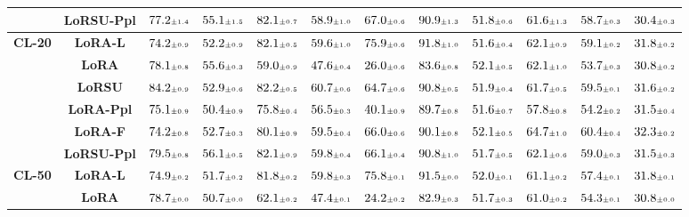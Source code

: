 \begin{table}
\begin{center}
\begin{small}
\begin{tabular}{l c c c c c c c c c c c}
& \textbf{LoRSU-Ppl} & $77.2 \mtiny{\pm 1.4}$ & $55.1 \mtiny{\pm 1.5}$ & $82.1 \mtiny{\pm 0.7}$ & $58.9 \mtiny{\pm 1.0}$ & $67.0 \mtiny{\pm 0.6}$ & $90.9 \mtiny{\pm 1.3}$ & $51.8 \mtiny{\pm 0.6}$ & $61.6 \mtiny{\pm 1.3}$ & $58.7 \mtiny{\pm 0.3}$ & $30.4 \mtiny{\pm 0.3}$ \\
\midrule
\multirow{6}{*}{\textbf{CL-20}} & \textbf{LoRA-L} & $74.2 \mtiny{\pm 0.9}$ & $52.2 \mtiny{\pm 0.9}$ & $82.1 \mtiny{\pm 0.5}$ & $59.6 \mtiny{\pm 1.0}$ & $75.9 \mtiny{\pm 0.6}$ & $91.8 \mtiny{\pm 1.0}$ & $51.6 \mtiny{\pm 0.4}$ & $62.1 \mtiny{\pm 0.9}$ & $59.1 \mtiny{\pm 0.2}$ & $31.8 \mtiny{\pm 0.2}$ \\
& \textbf{LoRA} & $78.1 \mtiny{\pm 0.8}$ & $55.6 \mtiny{\pm 0.3}$ & $59.0 \mtiny{\pm 0.9}$ & $47.6 \mtiny{\pm 0.4}$ & $26.0 \mtiny{\pm 0.6}$ & $83.6 \mtiny{\pm 0.8}$ & $52.1 \mtiny{\pm 0.5}$ & $62.1 \mtiny{\pm 1.0}$ & $53.7 \mtiny{\pm 0.3}$ & $30.8 \mtiny{\pm 0.2}$ \\
& \textbf{LoRSU} & $84.2 \mtiny{\pm 0.9}$ & $52.9 \mtiny{\pm 0.6}$ & $82.2 \mtiny{\pm 0.5}$ & $60.7 \mtiny{\pm 0.6}$ & $64.7 \mtiny{\pm 0.6}$ & $90.8 \mtiny{\pm 0.5}$ & $51.9 \mtiny{\pm 0.4}$ & $61.7 \mtiny{\pm 0.5}$ & $59.5 \mtiny{\pm 0.1}$ & $31.6 \mtiny{\pm 0.2}$ \\
& \textbf{LoRA-Ppl} & $75.1 \mtiny{\pm 0.9}$ & $50.4 \mtiny{\pm 0.9}$ & $75.8 \mtiny{\pm 0.4}$ & $56.5 \mtiny{\pm 0.3}$ & $40.1 \mtiny{\pm 0.9}$ & $89.7 \mtiny{\pm 0.8}$ & $51.6 \mtiny{\pm 0.7}$ & $57.8 \mtiny{\pm 0.8}$ & $54.2 \mtiny{\pm 0.2}$ & $31.5 \mtiny{\pm 0.4}$ \\
& \textbf{LoRA-F} & $74.2 \mtiny{\pm 0.8}$ & $52.7 \mtiny{\pm 0.3}$ & $80.1 \mtiny{\pm 0.9}$ & $59.5 \mtiny{\pm 0.4}$ & $66.0 \mtiny{\pm 0.6}$ & $90.1 \mtiny{\pm 0.8}$ & $52.1 \mtiny{\pm 0.5}$ & $64.7 \mtiny{\pm 1.0}$ & $60.4 \mtiny{\pm 0.4}$ & $32.3 \mtiny{\pm 0.2}$ \\
& \textbf{LoRSU-Ppl} & $79.5 \mtiny{\pm 0.8}$ & $56.1 \mtiny{\pm 0.5}$ & $82.1 \mtiny{\pm 0.9}$ & $59.8 \mtiny{\pm 0.4}$ & $66.1 \mtiny{\pm 0.4}$ & $90.8 \mtiny{\pm 1.0}$ & $51.7 \mtiny{\pm 0.5}$ & $62.1 \mtiny{\pm 0.6}$ & $59.0 \mtiny{\pm 0.3}$ & $31.5 \mtiny{\pm 0.3}$ \\
\midrule
\multirow{6}{*}{\textbf{CL-50}} & \textbf{LoRA-L} & $74.9 \mtiny{\pm 0.2}$ & $51.7 \mtiny{\pm 0.2}$ & $81.8 \mtiny{\pm 0.2}$ & $59.8 \mtiny{\pm 0.3}$ & $75.8 \mtiny{\pm 0.1}$ & $91.5 \mtiny{\pm 0.0}$ & $52.0 \mtiny{\pm 0.1}$ & $61.1 \mtiny{\pm 0.2}$ & $57.4 \mtiny{\pm 0.1}$ & $31.8 \mtiny{\pm 0.1}$ \\
& \textbf{LoRA} & $78.7 \mtiny{\pm 0.0}$ & $50.7 \mtiny{\pm 0.0}$ & $62.1 \mtiny{\pm 0.2}$ & $47.4 \mtiny{\pm 0.1}$ & $24.2 \mtiny{\pm 0.2}$ & $82.9 \mtiny{\pm 0.3}$ & $51.7 \mtiny{\pm 0.3}$ & $61.0 \mtiny{\pm 0.2}$ & $54.3 \mtiny{\pm 0.1}$ & $30.8 \mtiny{\pm 0.0}$ \\

\end{tabular}
\end{small}
\end{center}
\end{table}
